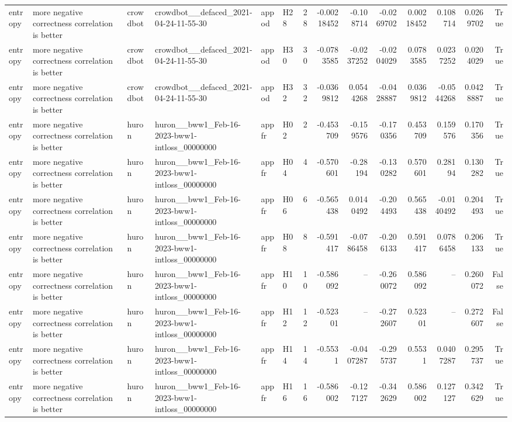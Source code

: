 \begin{longtable}{llllllrrrrrrrr}
entropy & more negative correctness correlation is better & crowdbot & crowdbot\_\_defaced\_2021-04-24-11-55-30 & appod & H28 & 28 & -0.00218452 & -0.108714 & -0.0269702 & 0.00218452 & 0.108714 & 0.0269702 & True \\
entropy & more negative correctness correlation is better & crowdbot & crowdbot\_\_defaced\_2021-04-24-11-55-30 & appod & H30 & 30 & -0.0783585 & -0.0237252 & -0.0204029 & 0.0783585 & 0.0237252 & 0.0204029 & True \\
entropy & more negative correctness correlation is better & crowdbot & crowdbot\_\_defaced\_2021-04-24-11-55-30 & appod & H32 & 32 & -0.0369812 & 0.0544268 & -0.0428887 & 0.0369812 & -0.0544268 & 0.0428887 & True \\
entropy & more negative correctness correlation is better & huron & huron\_\_bww1\_Feb-16-2023-bww1-intloss\_00000000 & appfr & H02 & 2 & -0.453709 & -0.159576 & -0.170356 & 0.453709 & 0.159576 & 0.170356 & True \\
entropy & more negative correctness correlation is better & huron & huron\_\_bww1\_Feb-16-2023-bww1-intloss\_00000000 & appfr & H04 & 4 & -0.570601 & -0.28194 & -0.130282 & 0.570601 & 0.28194 & 0.130282 & True \\
entropy & more negative correctness correlation is better & huron & huron\_\_bww1\_Feb-16-2023-bww1-intloss\_00000000 & appfr & H06 & 6 & -0.565438 & 0.0140492 & -0.204493 & 0.565438 & -0.0140492 & 0.204493 & True \\
entropy & more negative correctness correlation is better & huron & huron\_\_bww1\_Feb-16-2023-bww1-intloss\_00000000 & appfr & H08 & 8 & -0.591417 & -0.0786458 & -0.206133 & 0.591417 & 0.0786458 & 0.206133 & True \\
entropy & more negative correctness correlation is better & huron & huron\_\_bww1\_Feb-16-2023-bww1-intloss\_00000000 & appfr & H10 & 10 & -0.586092 & -- & -0.260072 & 0.586092 & -- & 0.260072 & False \\
entropy & more negative correctness correlation is better & huron & huron\_\_bww1\_Feb-16-2023-bww1-intloss\_00000000 & appfr & H12 & 12 & -0.52301 & -- & -0.272607 & 0.52301 & -- & 0.272607 & False \\
entropy & more negative correctness correlation is better & huron & huron\_\_bww1\_Feb-16-2023-bww1-intloss\_00000000 & appfr & H14 & 14 & -0.5531 & -0.0407287 & -0.295737 & 0.5531 & 0.0407287 & 0.295737 & True \\
entropy & more negative correctness correlation is better & huron & huron\_\_bww1\_Feb-16-2023-bww1-intloss\_00000000 & appfr & H16 & 16 & -0.586002 & -0.127127 & -0.342629 & 0.586002 & 0.127127 & 0.342629 & True \\

\end{longtable}
